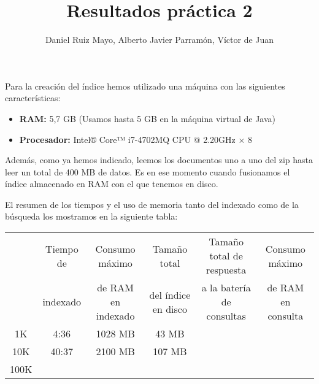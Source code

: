 \documentclass[palatino,nochap]{apuntes}
\title{Resultados práctica 2}
\author{Daniel Ruiz Mayo, Alberto Javier Parramón, Víctor de Juan}
\date{}
\begin{document}
\pagestyle{plain}
\maketitle



Para la creación del índice hemos utilizado una máquina con las siguientes características:

\begin{itemize}
	\item \textbf{RAM: }5,7 GB (Usamos hasta 5 GB en la máquina virtual de Java)
	\item \textbf{Procesador: } Intel® Core™ i7-4702MQ CPU @ 2.20GHz × 8 
\end{itemize}

Además, como ya hemos indicado, leemos los documentos uno a uno del zip hasta leer un total de 400 MB de datos. Es en ese momento cuando fusionamos el índice almacenado en RAM con el que tenemos en disco.

El resumen de los tiempos y el uso de memoria tanto del indexado como de la búsqueda los mostramos en la siguiente tabla:

\small{
\begin{changemargin}{-2cm}{0cm}
\begin{tabular}{|c|c|c|c|c|c|}
	\hline
	 & Tiempo de & Consumo máximo & Tamaño total & Tamaño total de respuesta & Consumo máximo  \\
	 & indexado & de RAM en indexado & del índice en disco & a la batería de consultas & de RAM en consulta \\
	\hline
	1K & 4:36 & 1028 MB  & 43 MB & & \\
	\hline
	10K & 40:37 & 2100 MB & 107 MB & & \\
	\hline
	100K &  &  & & & \\
	\hline
\end{tabular}
\end{changemargin}
}
\end{document}
